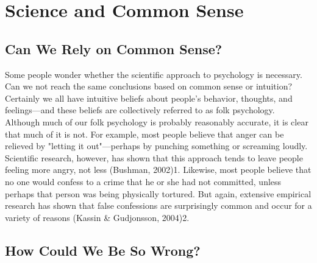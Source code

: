 \newpage
\section{Science and Common Sense}


\subsection{Can We Rely on Common Sense?}
Some people wonder whether the scientific approach to psychology is necessary. Can we not reach the same conclusions based on common sense or intuition? Certainly we all have intuitive beliefs about people's behavior, thoughts, and feelings---and these beliefs are collectively referred to as folk psychology. Although much of our folk psychology is probably reasonably accurate, it is clear that much of it is not. For example, most people believe that anger can be relieved by "letting it out"---perhaps by punching something or screaming loudly. Scientific research, however, has shown that this approach tends to leave people feeling more angry, not less (Bushman, 2002)1. Likewise, most people believe that no one would confess to a crime that he or she had not committed, unless perhaps that person was being physically tortured. But again, extensive empirical research has shown that false confessions are surprisingly common and occur for a variety of reasons (Kassin \& Gudjonsson, 2004)2.

\subsection{How Could We Be So Wrong?}

